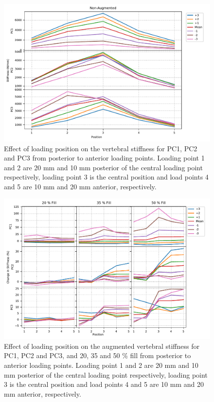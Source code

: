 \begin{figure}[p]
  \centering
  \includegraphics[width=.9\textheight, angle=90]{Chapters/Chapter_PCA_images/AP_LP_non_aug.pdf}
  \caption[Effect of loading position on the vertebral stiffness.]{Effect of loading position on the vertebral stiffness for PC1, PC2 and PC3 from posterior to anterior loading points. Loading point 1 and 2 are 20 mm and 10 mm posterior of the central loading point respectively, loading point 3 is the central position and load points 4 and 5 are 10 mm and 20 mm anterior, respectively. }
  \label{fig:AP_LP_non_aug}
\end{figure}

\begin{figure}[p]
  \centering
  \includegraphics[width=.9\textheight, angle=90]{Chapters/Chapter_PCA_images/AP_change_from_non_aug.pdf}
  \caption[Effect of loading position on the augmented vertebral stiffness.]{Effect of loading position on the augmented vertebral stiffness for PC1, PC2 and PC3, and 20, 35 and 50 \% fill from posterior to anterior loading points. Loading point 1 and 2 are 20 mm and 10 mm posterior of the central loading point respectively, loading point 3 is the central position and load points 4 and 5 are 10 mm and 20 mm anterior, respectively. }
  \label{fig:AP_change_from_non_aug}
\end{figure}
	
